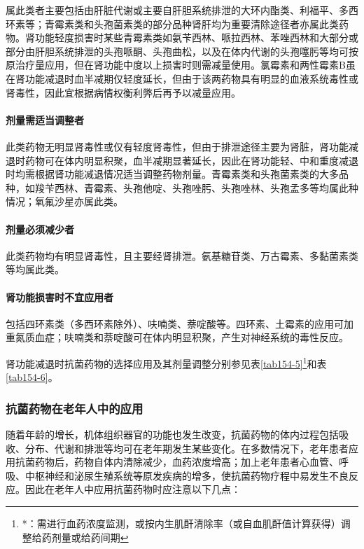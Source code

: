 属此类者主要包括由肝脏代谢或主要自肝胆系统排泄的大环内酯类、利福平、多西环素等；青霉素类和头孢菌素类的部分品种肾肝均为重要清除途径者亦属此类药物。肾功能轻度损害时某些青霉素类如氨苄西林、哌拉西林、苯唑西林和大部分或部分由肝胆系统排泄的头孢哌酮、头孢曲松，以及在体内代谢的头孢噻肟等均可按原治疗量应用，但在肾功能中度以上损害时则需减量使用。氯霉素和两性霉素B虽在肾功能减退时血半减期仅轻度延长，但由于该两药物具有明显的血液系统毒性或肾毒性，因此宜根据病情权衡利弊后再予以减量应用。

\paragraph{剂量需适当调整者}

此类药物无明显肾毒性或仅有轻度肾毒性，但由于排泄途径主要为肾脏，肾功能减退时药物可在体内明显积聚，血半减期显著延长，因此在肾功能轻、中和重度减退时均需根据肾功能减退情况适当调整药物剂量。青霉素类和头孢菌素类的大多品种，如羧苄西林、青霉素、头孢他啶、头孢唑肟、头孢唑林、头孢孟多等均属此种情况；氧氟沙星亦属此类。

\paragraph{剂量必须减少者}

此类药物均有明显肾毒性，且主要经肾排泄。氨基糖苷类、万古霉素、多黏菌素类等均属此类。

\paragraph{肾功能损害时不宜应用者}

包括四环素类（多西环素除外）、呋喃类、萘啶酸等。四环素、土霉素的应用可加重氮质血症；呋喃类和萘啶酸可在体内明显积聚，产生对神经系统的毒性反应。

肾功能减退时抗菌药物的选择应用及其剂量调整分别参见表\ref{tab154-5}\footnote{*：需进行血药浓度监测，或按内生肌酐清除率（或自血肌酐值计算获得）调整给药剂量或给药间期}和表\ref{tab154-6}。

\subsubsection{抗菌药物在老年人中的应用}

随着年龄的增长，机体组织器官的功能也发生改变，抗菌药物的体内过程包括吸收、分布、代谢和排泄等均可在老年期发生某些变化。在多数情况下，老年患者应用抗菌药物后，药物自体内清除减少，血药浓度增高；加上老年患者心血管、呼吸、中枢神经和泌尿生殖系统等原发疾病的增多，使抗菌药物疗程中易发生不良反应。因此在老年人中应用抗菌药物时应注意以下几点：

